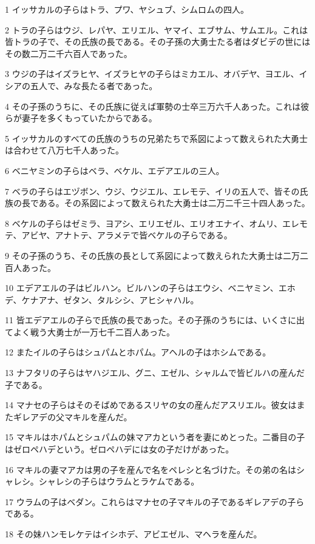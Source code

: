 \par 1 イッサカルの子らはトラ、プワ、ヤシュブ、シムロムの四人。
\par 2 トラの子らはウジ、レパヤ、エリエル、ヤマイ、エブサム、サムエル。これは皆トラの子で、その氏族の長である。その子孫の大勇士たる者はダビデの世にはその数二万二千六百人であった。
\par 3 ウジの子はイズラヒヤ、イズラヒヤの子らはミカエル、オバデヤ、ヨエル、イシアの五人で、みな長たる者であった。
\par 4 その子孫のうちに、その氏族に従えば軍勢の士卒三万六千人あった。これは彼らが妻子を多くもっていたからである。
\par 5 イッサカルのすべての氏族のうちの兄弟たちで系図によって数えられた大勇士は合わせて八万七千人あった。
\par 6 ベニヤミンの子らはベラ、ベケル、エデアエルの三人。
\par 7 ベラの子らはエヅボン、ウジ、ウジエル、エレモテ、イリの五人で、皆その氏族の長である。その系図によって数えられた大勇士は二万二千三十四人あった。
\par 8 ベケルの子らはゼミラ、ヨアシ、エリエゼル、エリオエナイ、オムリ、エレモテ、アビヤ、アナトテ、アラメテで皆ベケルの子らである。
\par 9 その子孫のうち、その氏族の長として系図によって数えられた大勇士は二万二百人あった。
\par 10 エデアエルの子はビルハン。ビルハンの子らはエウシ、ベニヤミン、エホデ、ケナアナ、ゼタン、タルシシ、アヒシャハル。
\par 11 皆エデアエルの子らで氏族の長であった。その子孫のうちには、いくさに出てよく戦う大勇士が一万七千二百人あった。
\par 12 またイルの子らはシュパムとホパム。アヘルの子はホシムである。
\par 13 ナフタリの子らはヤハジエル、グニ、エゼル、シャルムで皆ビルハの産んだ子である。
\par 14 マナセの子らはそのそばめであるスリヤの女の産んだアスリエル。彼女はまたギレアデの父マキルを産んだ。
\par 15 マキルはホパムとシュパムの妹マアカという者を妻にめとった。二番目の子はゼロペハデという。ゼロペハデには女の子だけがあった。
\par 16 マキルの妻マアカは男の子を産んで名をペレシと名づけた。その弟の名はシャレシ。シャレシの子らはウラムとラケムである。
\par 17 ウラムの子はベダン。これらはマナセの子マキルの子であるギレアデの子らである。
\par 18 その妹ハンモレケテはイシホデ、アビエゼル、マヘラを産んだ。
